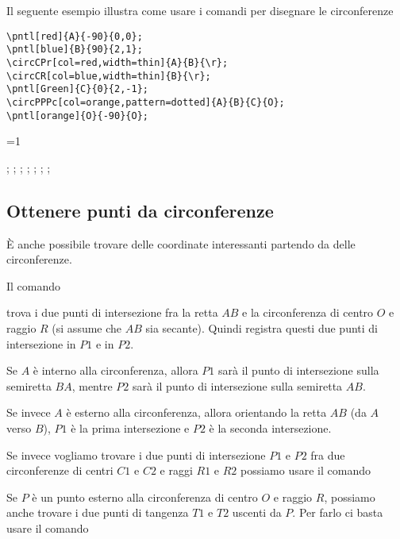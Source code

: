 \documentclass[italian, a4paper]{article}
\def\showimmagini{1} %
\newcommand{\bs}{\textbackslash}
\newcommand{\ttt}[1]{\texttt{#1}}
\newcommand{\comandons}[2][\large]{\vspace*{1mm}\noindent\fbox{\parbox{\textwidth}{#1\ttt{#2}}}}
\newcommand{\comando}[2][\large]{\comandons[#1]{#2}\vspace*{3mm}}
\newcommand{\blue}[1]{\textcolor{blue}{#1}}
\newcommand{\Green}[1]{\textcolor{Green}{#1}}
\begin{document}
Il seguente esempio illustra come usare i comandi per disegnare le circonferenze

\begin{Verbatim}[frame=single]
\pntl[red]{A}{-90}{0,0};
\pntl[blue]{B}{90}{2,1};
\circCPr[col=red,width=thin]{A}{B}{\r};
\circCR[col=blue,width=thin]{B}{\r};
\pntl[Green]{C}{0}{2,-1};
\circPPPc[col=orange,pattern=dotted]{A}{B}{C}{O};
\pntl[orange]{O}{-90}{O};
\end{Verbatim}
\vspace*{-4mm}

\ifnum\showimmagini=1
\begin{immagine}
;
;
;
;
;
;
;
\end{immagine}
\fi

\newpage\subsection{Ottenere punti da circonferenze}
È anche possibile trovare delle coordinate interessanti partendo da delle circonferenze.

Il comando

\comandons{\bs interLC\{\Green{P1}\}\{\Green{P2}\}\{\blue{A}\}\{\blue{B}\}\{\blue{O}\}\{\blue{R}\};}
trova i due punti di intersezione fra la retta $AB$ e la circonferenza di centro $O$ e raggio $R$ (si assume che $AB$ sia secante). Quindi registra questi due punti di intersezione in $P1$ e in $P2$.

Se $A$ è interno alla circonferenza, allora $P1$ sarà il punto di intersezione sulla semiretta $BA$, mentre $P2$ sarà il punto di intersezione sulla semiretta $AB$.

Se invece $A$ è esterno alla circonferenza, allora orientando la retta $AB$ (da $A$ verso $B$), $P1$ è la prima intersezione e $P2$ è la seconda intersezione.

Se invece vogliamo trovare i due punti di intersezione $P1$ e $P2$ fra due circonferenze di centri $C1$ e $C2$ e raggi $R1$ e $R2$ possiamo usare il comando

\comando{\bs interCC\{\Green{P1}\}\{\Green{P2}\}\{\blue{O1}\}\{\blue{R1}\}\{\blue{O2}\}\{\blue{R2}\};}

Se $P$ è un punto esterno alla circonferenza di centro $O$ e raggio $R$, possiamo anche trovare i due punti di tangenza $T1$ e $T2$ uscenti da $P$. Per farlo ci basta usare il comando
\end{document}
